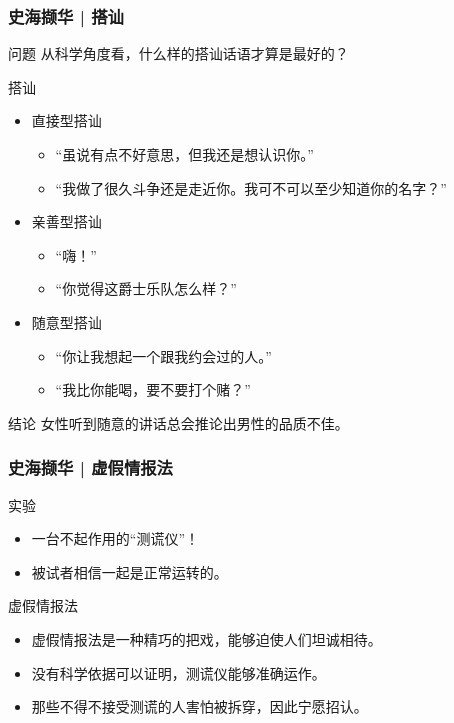 \begin{frame}
  \frametitle{史海撷华 | 搭讪}
  \begin{block}{问题}
    从科学角度看，什么样的搭讪话语才算是最好的？
  \end{block}
  \pause
  \begin{block}{搭讪}
    \begin{itemize}
      \item 直接型搭讪
        \begin{itemize}
          \item “虽说有点不好意思，但我还是想认识你。”
          \item “我做了很久斗争还是走近你。我可不可以至少知道你的名字？”
        \end{itemize}
      \item 亲善型搭讪
        \begin{itemize}
          \item “嗨！”
          \item “你觉得这爵士乐队怎么样？”
        \end{itemize}
      \item 随意型搭讪
        \begin{itemize}
          \item “你让我想起一个跟我约会过的人。”
          \item “我比你能喝，要不要打个赌？”
        \end{itemize}
    \end{itemize}
  \end{block}
  \pause
  \begin{block}{结论}
    女性听到随意的讲话总会推论出男性的品质不佳。
  \end{block}
\end{frame}

\begin{frame}
  \frametitle{史海撷华 | 虚假情报法}
  \begin{block}{实验}
    \begin{itemize}
      \item 一台不起作用的“测谎仪”！
      \item 被试者相信一起是正常运转的。
    \end{itemize}
  \end{block}
  \pause
  \begin{block}{虚假情报法}
    \begin{itemize}
      \item 虚假情报法是一种精巧的把戏，能够迫使人们坦诚相待。
      \item 没有科学依据可以证明，测谎仪能够准确运作。
      \item 那些不得不接受测谎的人害怕被拆穿，因此宁愿招认。
    \end{itemize}
  \end{block}
\end{frame}

